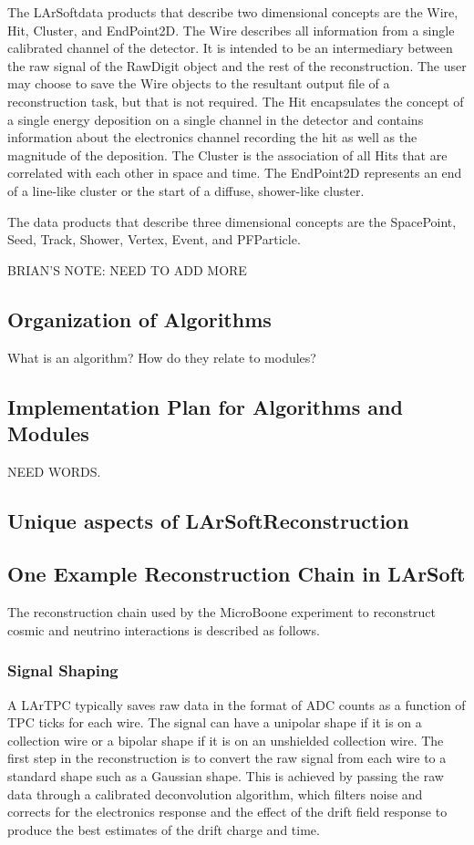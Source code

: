 \documentclass[12pt]{elsarticle}
\newcommand{\larsoft}{LArSoft}
\begin{document}
The \larsoft data products that describe two dimensional concepts are the Wire, Hit, Cluster, and EndPoint2D.  The Wire describes all information from a single calibrated channel of the detector.  It is intended to be an intermediary between the raw signal of the RawDigit object and the rest of the reconstruction.  The user may choose to save the Wire objects to the resultant output file of a reconstruction task, but that is not required.  The Hit encapsulates the concept of a single energy deposition on a single channel in the detector and contains information about the electronics channel recording the hit as well as the magnitude of the deposition.  The Cluster is the association of all Hits that are correlated with each other in space and time.  The EndPoint2D represents an end of a line-like cluster or the start of a diffuse, shower-like cluster.

The data products that describe three dimensional concepts are the SpacePoint, Seed, Track, Shower, Vertex, Event, and PFParticle. 
 
BRIAN'S NOTE: NEED TO ADD MORE 

\subsection{Organization of Algorithms}

What is an algorithm? How do they relate to modules?

\subsection{Implementation Plan for Algorithms and Modules}
NEED WORDS.

\subsection{Unique aspects of \larsoft Reconstruction}

\subsection{One Example Reconstruction Chain in \larsoft}
The reconstruction chain used by the MicroBoone experiment to reconstruct cosmic and neutrino interactions is described as follows.

\subsubsection{Signal Shaping}
A LArTPC typically saves raw data in the format of ADC counts as a function of TPC ticks for each wire. The signal can have a unipolar shape if it is on a collection wire or a bipolar shape if it is on an unshielded collection wire. The first step in the reconstruction is to convert the raw signal from each wire to a standard shape such as a Gaussian shape. This is achieved by passing the raw data through a calibrated deconvolution algorithm, which filters noise and corrects for the electronics response and the effect of the drift field response to produce the best estimates of the drift charge and time. 
\end{document}
